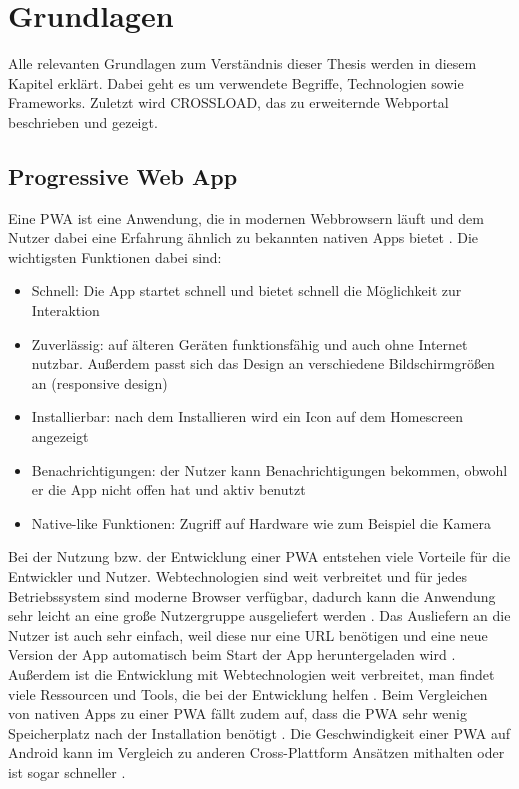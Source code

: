 \chapter{Grundlagen}
\label{Kap2}

Alle relevanten Grundlagen zum Verständnis dieser Thesis werden in diesem Kapitel erklärt. Dabei geht es um verwendete Begriffe, Technologien sowie Frameworks. Zuletzt wird CROSSLOAD, das zu erweiternde Webportal beschrieben und gezeigt.

\section{Progressive Web App}
Eine \ac{PWA} ist eine Anwendung, die in modernen Webbrowsern läuft und dem Nutzer dabei eine Erfahrung ähnlich zu bekannten nativen Apps bietet \autocite{Sheppard2017} \autocite{Rojas2020}. Die wichtigsten Funktionen dabei sind:

\begin{itemize}
  \item Schnell: Die App startet schnell und bietet schnell die Möglichkeit zur Interaktion \autocite{Hajian2019} \autocite{Sheppard2017}
  \item Zuverlässig: auf älteren Geräten funktionsfähig und auch ohne Internet nutzbar. Außerdem passt sich das Design an verschiedene Bildschirmgrößen an (responsive design) \autocite{Hajian2019} \autocite{Sheppard2017}
  \item Installierbar: nach dem Installieren wird ein Icon auf dem Homescreen angezeigt \autocite{Hajian2019} \autocite{Sheppard2017} \autocite{Rojas2020}
  \item Benachrichtigungen: der Nutzer kann Benachrichtigungen bekommen, obwohl er die App nicht offen hat und aktiv benutzt \autocite{Hajian2019} \autocite{Sheppard2017} 
  \item Native-like Funktionen: Zugriff auf Hardware wie zum Beispiel die Kamera \autocite{Hajian2019}
\end{itemize}

Bei der Nutzung bzw. der Entwicklung einer \ac{PWA} entstehen viele Vorteile für die Entwickler und Nutzer. Webtechnologien sind weit verbreitet und für jedes Betriebssystem sind moderne Browser verfügbar, dadurch kann die Anwendung sehr leicht an eine große Nutzergruppe ausgeliefert werden \autocite{Rojas2020}. Das Ausliefern an die Nutzer ist auch sehr einfach, weil diese nur eine URL benötigen \autocite{KHAN2019289} und eine neue Version der App automatisch beim Start der App heruntergeladen wird \autocite{Rojas2020}. Außerdem ist die Entwicklung mit Webtechnologien weit verbreitet, man findet viele Ressourcen und Tools, die bei der Entwicklung helfen \autocite{Rojas2020}. Beim Vergleichen von nativen Apps zu einer \ac{PWA} fällt zudem auf, dass die \ac{PWA} sehr wenig Speicherplatz nach der Installation benötigt \autocite{biorn2017} \autocite{KHAN2019289}. Die Geschwindigkeit einer \ac{PWA} auf Android kann im Vergleich zu anderen Cross-Plattform Ansätzen mithalten oder ist sogar schneller \autocite{biorn2017}.

